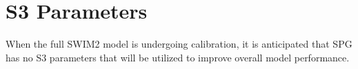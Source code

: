 \section{S3 Parameters}
When the full SWIM2 model is undergoing calibration, it is anticipated that SPG has no S3 parameters that will be utilized to improve overall model performance.
